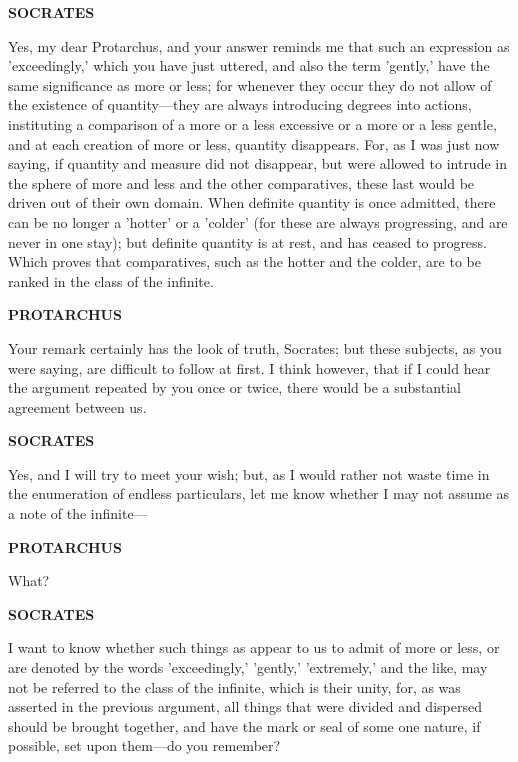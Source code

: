 \documentclass[11pt,letter]{article}
\begin{document}
\par \textbf{SOCRATES}
\par   Yes, my dear Protarchus, and your answer reminds me that such an expression as 'exceedingly,' which you have just uttered, and also the term 'gently,' have the same significance as more or less; for whenever they occur they do not allow of the existence of quantity—they are always introducing degrees into actions, instituting a comparison of a more or a less excessive or a more or a less gentle, and at each creation of more or less, quantity disappears. For, as I was just now saying, if quantity and measure did not disappear, but were allowed to intrude in the sphere of more and less and the other comparatives, these last would be driven out of their own domain. When definite quantity is once admitted, there can be no longer a 'hotter' or a 'colder' (for these are always progressing, and are never in one stay); but definite quantity is at rest, and has ceased to progress. Which proves that comparatives, such as the hotter and the colder, are to be ranked in the class of the infinite.

\par \textbf{PROTARCHUS}
\par   Your remark certainly has the look of truth, Socrates; but these subjects, as you were saying, are difficult to follow at first. I think however, that if I could hear the argument repeated by you once or twice, there would be a substantial agreement between us.

\par \textbf{SOCRATES}
\par   Yes, and I will try to meet your wish; but, as I would rather not waste time in the enumeration of endless particulars, let me know whether I may not assume as a note of the infinite—

\par \textbf{PROTARCHUS}
\par   What?

\par \textbf{SOCRATES}
\par   I want to know whether such things as appear to us to admit of more or less, or are denoted by the words 'exceedingly,' 'gently,' 'extremely,' and the like, may not be referred to the class of the infinite, which is their unity, for, as was asserted in the previous argument, all things that were divided and dispersed should be brought together, and have the mark or seal of some one nature, if possible, set upon them—do you remember?
\end{document}

